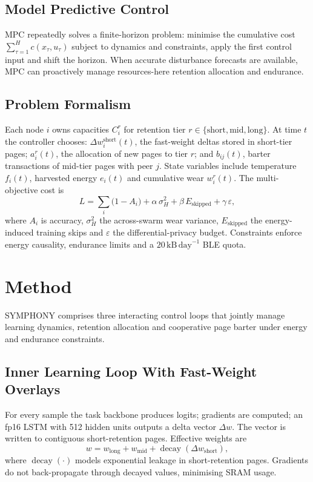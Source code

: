 \documentclass{article}
\begin{document}
\subsection{Model Predictive Control}
MPC repeatedly solves a finite-horizon problem: minimise the cumulative cost \(\sum_{\tau=1}^{H} c(x_{\tau}, u_{\tau})\) subject to dynamics and constraints, apply the first control input and shift the horizon. When accurate disturbance forecasts are available, MPC can proactively manage resources-here retention allocation and endurance.

\subsection{Problem Formalism}
Each node \(i\) owns capacities \(C_{i}^{r}\) for retention tier \(r \in \{\text{short}, \text{mid}, \text{long}\}\). At time \(t\) the controller chooses: \(\Delta w_{i}^{\text{short}}(t)\), the fast-weight deltas stored in short-tier pages; \(a_{i}^{r}(t)\), the allocation of new pages to tier \(r\); and \(b_{ij}(t)\), barter transactions of mid-tier pages with peer \(j\). State variables include temperature \(f_{i}(t)\), harvested energy \(e_{i}(t)\) and cumulative wear \(w_{i}^{r}(t)\). The multi-objective cost is
\[ L = \sum_{i} \bigl(1 - A_{i}\bigr) + \alpha \, \sigma_{H}^{2} + \beta \, E_{\text{skipped}} + \gamma \, \varepsilon, \]
where \(A_{i}\) is accuracy, \(\sigma_{H}^{2}\) the across-swarm wear variance, \(E_{\text{skipped}}\) the energy-induced training skips and \(\varepsilon\) the differential-privacy budget. Constraints enforce energy causality, endurance limits and a \(20\,\mathrm{kB}\,\mathrm{day}^{-1}\) BLE quota.

\section{Method}
SYMPHONY comprises three interacting control loops that jointly manage learning dynamics, retention allocation and cooperative page barter under energy and endurance constraints.

\subsection{Inner Learning Loop With Fast-Weight Overlays}
For every sample the task backbone produces logits; gradients are computed; an fp16 LSTM with 512 hidden units outputs a delta vector \(\Delta w\). The vector is written to contiguous short-retention pages. Effective weights are
\[ w = w_{\mathrm{long}} + w_{\mathrm{mid}} + \operatorname{decay}(\Delta w_{\mathrm{short}}), \]
where \(\operatorname{decay}(\cdot)\) models exponential leakage in short-retention pages. Gradients do not back-propagate through decayed values, minimising SRAM usage.
\end{document}
